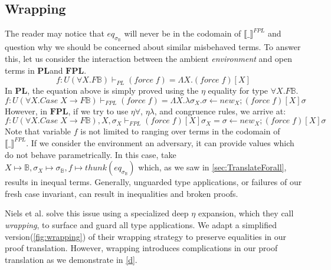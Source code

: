 \documentclass[acmsmall]{acmart}
\newcommand{\den}[1]{\llbracket #1\rrbracket}
\newcommand{\eric}[1]{\textcolor{red}{ <eric-#1> }}
\newcommand{\pl}{$\mathbf{PL}$}
\newcommand{\fpl}{$\mathbf{FPL}$}
\begin{document}
\subsection{Wrapping}\label{sec:Wrap}
The reader may notice that $eq_{\sigma_{\mathbb{B}}}$ will never be in the codomain of $\den{\_}^{FPL}$ and question why we should be concerned about similar misbehaved terms. To answer this, let us consider the interaction between the ambient \textit{environment} and open terms in \pl\;and \fpl.
\[
  f : U(\forall X.F \mathbb{B}) \vdash_{PL} (force\;f) = \Lambda X. (force\;f)[X]
\]
In \pl, the equation above is simply proved using the $\eta$ equality for type $\forall X. F \mathbb{B}$. 
\[
  f : U(\forall X.Case\;X \to F \mathbb{B}) \vdash_{FPL} (force\;f) = \Lambda X. \lambda \sigma_X. \sigma \leftarrow new_X;(force\;f)[X]\sigma
\]
However, in \fpl, if we try to use $\eta\forall$, $\eta\lambda$, and congruence rules, we arrive at: 
\[
  f : U(\forall X.Case\;X \to F \mathbb{B}),X,\sigma_X \vdash_{FPL} (force\;f)[X]\sigma_X = \sigma \leftarrow new_X;(force\;f)[X]\sigma
\]
Note that variable $f$ is not limited to ranging over terms in the codomain of $\den{\_}^{FPL}$. If we consider the environment an adversary, it can provide values which do not behave parametrically. In this case, take $X\mapsto \mathbb{B}, \sigma_X \mapsto \sigma_\mathbb{B}, f \mapsto thunk(eq_{\sigma_{\mathbb{B}}})$ which, as we saw in \cref{sec:TranslateForall}, results in inequal terms.
Generally, unguarded type applications, or failures of our fresh case invariant, can result in inequalities and broken proofs.

Niels et al.\cite{NonParam} solve this issue using a specialized deep $\eta$ expansion, which they call \textit{wrapping}, to surface and guard all type applications. We adapt a simplified version(\cref{fig:wrapping}) of their wrapping strategy to preserve equalities in our proof translation. However, wrapping introduces complications in our proof translation as we demonstrate in \cref{d}.
\end{document}
